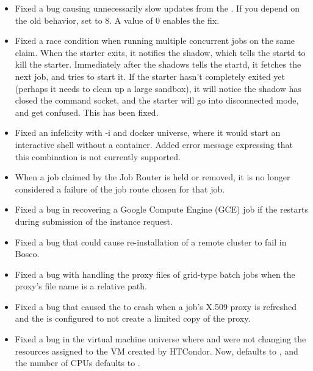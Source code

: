 \begin{itemize}

\item Fixed a bug causing unnecessarily slow updates from the .
If you depend on the old behavior, set  to 8.  A
value of 0 enables the fix.

\item Fixed a race condition when running multiple concurrent jobs on the same claim.
When the starter exits, it notifies the shadow, which tells the startd to kill the starter.
Immediately after the shadows tells the startd, it fetches the next job, and tries to start it.
If the starter hasn't completely exited yet (perhaps it needs to clean up a large sandbox),
it will notice the shadow has closed the command socket, and the starter will go into disconnected
mode, and get confused.  This has been fixed.

\item Fixed an infelicity with  -i and docker universe,
where it would start an interactive shell without a container.  Added error
message expressing that this combination is not currently supported.

\item When a job claimed by the Job Router is held or removed, it is no
longer considered a failure of the job route chosen for that job.

\item Fixed a bug in recovering a Google Compute Engine (GCE) job if the
 restarts during submission of the instance request.

\item Fixed a bug that could cause re-installation of a remote cluster
to fail in Bosco.

\item Fixed a bug with handling the proxy files of grid-type batch jobs
when the proxy's file name is a relative path.

\item Fixed a bug that caused the  to crash when a job's
X.509 proxy is refreshed and the  is configured to not
create a limited copy of the proxy.

\item Fixed a bug in the virtual machine universe where 
and  were not changing the resources assigned to the VM
created by HTCondor.  Now,  defaults to ,
and the number of CPUs defaults to .

\end{itemize}
